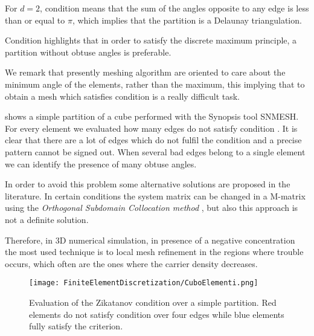 \begin{Osservazione}
For $d=2$, condition  means that the sum of the angles opposite to any edge is less than or equal to $\pi$, which implies that the partition is a Delaunay triangulation.
\end{Osservazione}

\begin{Osservazione}
Condition  highlights that in order to satisfy the discrete maximum principle, a partition without obtuse angles is preferable.
\end{Osservazione}

We remark that presently meshing algorithm are oriented to care about the minimum angle of the elements, rather than the maximum, this implying that to obtain a mesh which satisfies condition  is a really difficult task. 

 shows a simple partition of a cube performed with the Synopsis tool SNMESH. For every element we evaluated how many edges do not satisfy condition .
It is clear that there are a lot of edges which do not fulfil the condition and a precise pattern cannot be signed out. When several bad edges belong to a single element we can identify the presence of many obtuse angles.

In order to avoid this problem some alternative solutions are proposed in the literature. In certain conditions the system matrix can be changed in a M-matrix using the \textit{Orthogonal Subdomain Collocation method} \cite{OSCputticorded}, but also this approach is not a definite solution. 

Therefore, in 3D numerical simulation, in presence of a negative concentration the most used technique  is to local mesh refinement in the regions where trouble occurs, which often are the ones where the carrier density decreases.



\begin{figure}[!b]
\centering
{\texttt{[image: FiniteElementDiscretization/CuboElementi.png]}}
\caption{Evaluation of the Zikatanov condition over a simple partition. Red elements do not satisfy condition   over four edges while blue elements fully satisfy the criterion.}
\label{fig: cubo zikatanov}
\end{figure}

